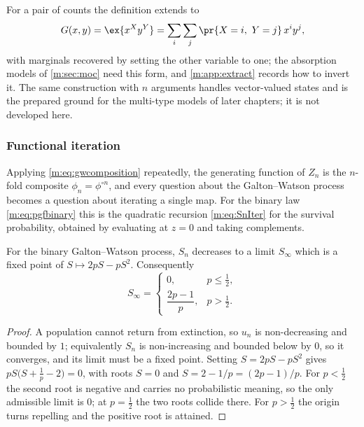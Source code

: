 For a pair of counts the definition extends to
\begin{equation}
\label{m:eq:pgfbivariate}
G(x,y) = \ex{x^Xy^Y} = \sum_i\sum_j\pr{X=i,\ Y=j}\,x^iy^j ,
\end{equation}
with marginals recovered by setting the other variable to one; the absorption
models of \cref{m:sec:moc} need this form, and \cref{m:app:extract} records how to
invert it. The same construction with $n$ arguments handles vector-valued states
and is the prepared ground for the multi-type models of later chapters; it is not
developed here.

\subsubsection{Functional iteration}
\label{m:sec:iteration}

Applying \cref{m:eq:gwcomposition} repeatedly, the generating function of $Z_n$ is
the $n$-fold composite $\phi_n=\phi^{\circ n}$, and every question about the
Galton--Watson process becomes a question about iterating a single map. For the
binary law \cref{m:eq:pgfbinary} this is the quadratic recursion \cref{m:eq:SnIter}
for the survival probability, obtained by evaluating at $z=0$ and taking
complements.

\begin{proposition}
\label{m:sec:extinction}
For the binary Galton--Watson process, $S_n$ decreases to a limit $S_\infty$ which
is a fixed point of $S\mapsto2pS-pS^2$. Consequently
\begin{equation}
\label{m:eq:Sinfty}
S_\infty =
\begin{cases}
0, & p\le\tfrac12,\\[4pt]
\dfrac{2p-1}{p}, & p>\tfrac12 .
\end{cases}
\end{equation}
\end{proposition}

\begin{proof}
A population cannot return from extinction, so $u_n$ is non-decreasing and bounded
by $1$; equivalently $S_n$ is non-increasing and bounded below by $0$, so it
converges, and its limit must be a fixed point. Setting $S=2pS-pS^2$ gives
$pS\bigl(S+\tfrac1p-2\bigr)=0$, with roots $S=0$ and $S=2-1/p=(2p-1)/p$. For
$p<\tfrac12$ the second root is negative and carries no probabilistic meaning, so
the only admissible limit is $0$; at $p=\tfrac12$ the two roots collide there. For
$p>\tfrac12$ the origin turns repelling and the positive root is attained.
\end{proof}

